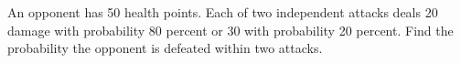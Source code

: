 An opponent has 50 health points. Each of two independent attacks deals 20 damage with probability 80 percent or 30 with probability 20 percent. Find the probability the opponent is defeated within two attacks.
